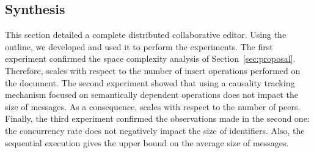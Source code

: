 \subsection{Synthesis}
This section detailed a complete distributed collaborative editor.  Using the
outline, we developed \EDITORNAME{} and used it to perform the experiments. The
first experiment confirmed the space complexity analysis of
Section~\ref{sec:proposal}. Therefore, \EDITORNAME{} scales with respect to the
number of insert operations performed on the document. The second experiment
showed that using a causality tracking mechanism focused on semantically
dependent operations does not impact the size of messages. As a consequence,
\EDITORNAME{} scales with respect to the number of peers. Finally, the third
experiment confirmed the observations made in the second one: the concurrency
rate does not negatively impact the size of identifiers. Also, the sequential
execution gives the upper bound on the average size of messages.


